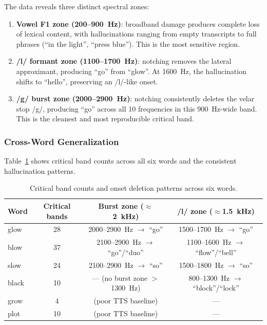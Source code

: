 \documentclass[11pt,a4paper]{article}
\begin{document}
The data reveals three distinct spectral zones:

\begin{enumerate}[leftmargin=*,itemsep=2pt]
    \item \textbf{Vowel F1 zone (200--900~Hz)}: broadband damage produces
        complete loss of lexical content, with hallucinations ranging from empty
        transcripts to full phrases (``in the light'', ``press blue''). This is
        the most sensitive region.
    \item \textbf{/l/ formant zone (1100--1700~Hz)}: notching removes the
        lateral approximant, producing ``go'' from ``glow''. At 1600~Hz, the
        hallucination shifts to ``hello'', preserving an /l/-like onset.
    \item \textbf{/g/ burst zone (2000--2900~Hz)}: notching consistently deletes
        the velar stop /g/, producing ``go'' across all 10 frequencies in this
        900~Hz-wide band. This is the cleanest and most reproducible critical
        band.
\end{enumerate}

\subsubsection{Cross-Word Generalization}
Table~\ref{tab:cross_word} shows critical band counts across all six words and
the consistent hallucination patterns.

\begin{table}[H]
\centering
\caption{Critical band counts and onset deletion patterns across six words.}
\label{tab:cross_word}
\begin{tabular}{@{}lccc@{}}
\toprule
\textbf{Word} & \textbf{Critical bands} & \textbf{Burst zone ($\approx$2~kHz)} &
\textbf{/l/ zone ($\approx$1.5~kHz)} \\
\midrule
glow  & 28 & 2000--2900~Hz $\rightarrow$ ``go''  &
1500--1700~Hz $\rightarrow$ ``go'' \\
blow  & 37 & 2100--2900~Hz $\rightarrow$ ``go''/``duo'' &
1100--1600~Hz $\rightarrow$ ``flow''/``bell'' \\
slow  & 24 & 2100--2900~Hz $\rightarrow$ ``so''  &
1500--1800~Hz $\rightarrow$ ``so'' \\
black & 10 & --- (no burst zone $>$1300~Hz) &
800--1300~Hz $\rightarrow$ ``block''/``lock'' \\
grow  &  4 & (poor TTS baseline)  & --- \\
plot  & 10 & (poor TTS baseline)  & --- \\
\bottomrule
\end{tabular}
\end{table}
\end{document}
